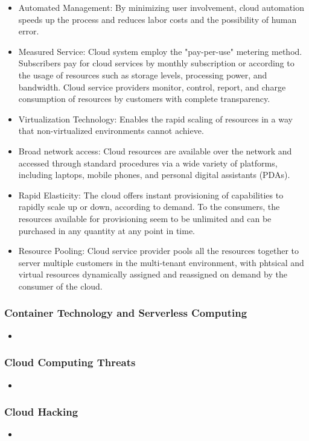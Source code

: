 \begin{itemize}
    \item Automated Management: By minimizing user involvement, cloud automation speeds up the process and reduces labor costs and the possibility of human error.
    \item Measured Service: Cloud system employ the "pay-per-use" metering method. Subscribers pay for cloud services by monthly subscription or according to the usage of resources such as storage levels, processing power, and bandwidth. Cloud service providers monitor, control, report, and charge consumption of resources by customers with complete transparency.
    \item Virtualization Technology: Enables the rapid scaling of resources in a way that non-virtualized environments cannot achieve.
    \item Broad network access: Cloud resources are available over the network and accessed through standard procedures via a wide variety of platforms, including laptops, mobile phones, and personal digital assistants (PDAs).
    \item Rapid Elasticity: The cloud offers instant provisioning of capabilities to rapidly scale up or down, according to demand. To the consumers, the resources available for provisioning seem to be unlimited and can be purchased in any quantity at any point in time.
    \item Resource Pooling: Cloud service provider pools all the resources together to server multiple customers in the multi-tenant environment, with phtsical and virtual resources dynamically assigned and reassigned on demand by the consumer of the cloud.
\end{itemize}
\subsubsection{Container Technology and Serverless Computing}
\begin{itemize}
    \item 
\end{itemize}
\subsubsection{Cloud Computing Threats}
\begin{itemize}
    \item 
\end{itemize}
\subsubsection{Cloud Hacking}
\begin{itemize}
    \item 
\end{itemize}
